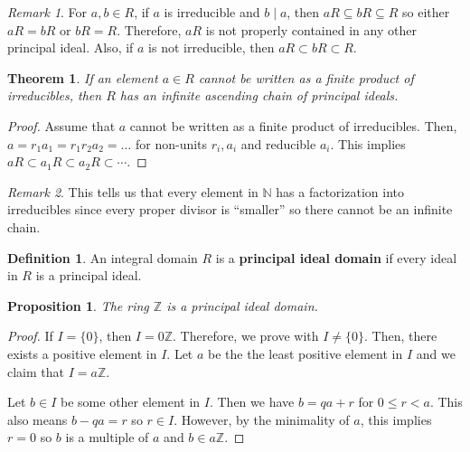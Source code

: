 \documentclass{article}
\newtheorem{theorem}{Theorem}[definition]
\newtheorem{proposition}{Proposition}[definition]
\theoremstyle{definition}
\newtheorem{definition}{Definition}[section]
\theoremstyle{remark}
\newtheorem{remark}{Remark}[definition]
\begin{document}
\begin{remark}
    For $a,b\in R$, if $a$ is irreducible and $b\mid a$, then
    $aR\subseteq bR\subseteq R$ so either $aR=bR$ or $bR=R$.
    Therefore, $aR$ is not properly contained in any other principal ideal.
    Also, if $a$ is not irreducible, then $aR\subset bR\subset R$.
\end{remark}

\begin{theorem}
    If an element $a\in R$ cannot be written as a finite product of
    irreducibles, then $R$ has an infinite ascending chain of principal ideals.
\end{theorem}

\begin{proof}
    Assume that $a$ cannot be written as a finite product of irreducibles.
    Then, $a=r_1a_1=r_1r_2a_2=\dots$ for non-units $r_i,a_i$ and reducible $a_i$.
    This implies $aR\subset a_1R\subset a_2R\subset\cdots$.
\end{proof}

\begin{remark}
    This tells us that every element in $\mathbb{N}$ has a factorization into
    irreducibles since every proper divisor is ``smaller'' so there cannot be
    an infinite chain.
\end{remark}

\begin{definition}
    An integral domain $R$ is a \textbf{principal ideal domain} if every ideal
    in $R$ is a principal ideal.
\end{definition}

\begin{proposition}
    \label{thm:integers is principal ideal domain}
    The ring $\mathbb{Z}$ is a principal ideal domain.
\end{proposition}

\begin{proof}
    If $I=\{0\}$, then $I=0\mathbb{Z}$.
    Therefore, we prove with $I\neq\{0\}$.
    Then, there exists a positive element in $I$.
    Let $a$ be the the least positive element in $I$ and we claim that
    $I=a\mathbb{Z}$.

    Let $b\in I$ be some other element in $I$.
    Then we have $b = qa + r$ for $0\leq r<a$.
    This also means $b-qa=r$ so $r\in I$.
    However, by the minimality of $a$, this implies $r=0$ so $b$ is a multiple
    of $a$ and $b\in a\mathbb{Z}$.
\end{proof}
\end{document}
